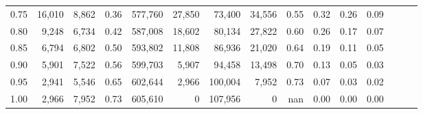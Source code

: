 \begin{tabular}{rrrrrrrrrrrrrrr}
0.75 &  16,010 &  8,862 &  0.36 &  577,760 &   27,850 &   73,400 &   34,556 &  0.55 &  0.32 &  0.26 &      0.09 \\
0.80 &   9,248 &  6,734 &  0.42 &  587,008 &   18,602 &   80,134 &   27,822 &  0.60 &  0.26 &  0.17 &      0.07 \\
0.85 &   6,794 &  6,802 &  0.50 &  593,802 &   11,808 &   86,936 &   21,020 &  0.64 &  0.19 &  0.11 &      0.05 \\
0.90 &   5,901 &  7,522 &  0.56 &  599,703 &    5,907 &   94,458 &   13,498 &  0.70 &  0.13 &  0.05 &      0.03 \\
0.95 &   2,941 &  5,546 &  0.65 &  602,644 &    2,966 &  100,004 &    7,952 &  0.73 &  0.07 &  0.03 &      0.02 \\
1.00 &   2,966 &  7,952 &  0.73 &  605,610 &        0 &  107,956 &        0 &   nan &  0.00 &  0.00 &      0.00 \\
\bottomrule
\end{tabular}
